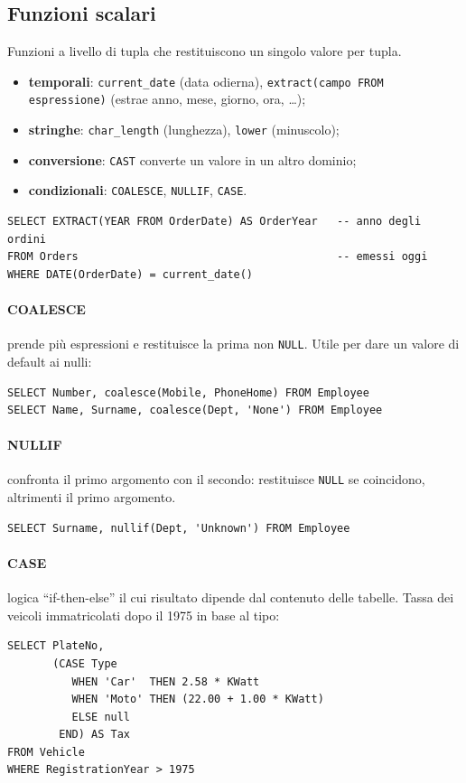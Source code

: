 \documentclass[a4paper,12pt]{article}
\begin{document}
\subsection{Funzioni scalari}

Funzioni a livello di tupla che restituiscono un singolo valore per tupla.
\begin{itemize}
  \item \textbf{temporali}: \texttt{current\_date} (data odierna),
    \texttt{extract(campo FROM espressione)} (estrae anno, mese, giorno,
    ora, \dots);
  \item \textbf{stringhe}: \texttt{char\_length} (lunghezza),
    \texttt{lower} (minuscolo);
  \item \textbf{conversione}: \texttt{CAST} converte un valore in un altro
    dominio;
  \item \textbf{condizionali}: \texttt{COALESCE}, \texttt{NULLIF},
    \texttt{CASE}.
\end{itemize}
\begin{verbatim}
SELECT EXTRACT(YEAR FROM OrderDate) AS OrderYear   -- anno degli ordini
FROM Orders                                        -- emessi oggi
WHERE DATE(OrderDate) = current_date()
\end{verbatim}

\paragraph{COALESCE} prende più espressioni e restituisce la prima non
\texttt{NULL}. Utile per dare un valore di default ai nulli:
\begin{verbatim}
SELECT Number, coalesce(Mobile, PhoneHome) FROM Employee
SELECT Name, Surname, coalesce(Dept, 'None') FROM Employee
\end{verbatim}

\paragraph{NULLIF} confronta il primo argomento con il secondo: restituisce
\texttt{NULL} se coincidono, altrimenti il primo argomento.
\begin{verbatim}
SELECT Surname, nullif(Dept, 'Unknown') FROM Employee
\end{verbatim}

\paragraph{CASE} logica ``if-then-else'' il cui risultato dipende dal contenuto
delle tabelle. Tassa dei veicoli immatricolati dopo il 1975 in base al tipo:
\begin{verbatim}
SELECT PlateNo,
       (CASE Type
          WHEN 'Car'  THEN 2.58 * KWatt
          WHEN 'Moto' THEN (22.00 + 1.00 * KWatt)
          ELSE null
        END) AS Tax
FROM Vehicle
WHERE RegistrationYear > 1975
\end{verbatim}
\end{document}
